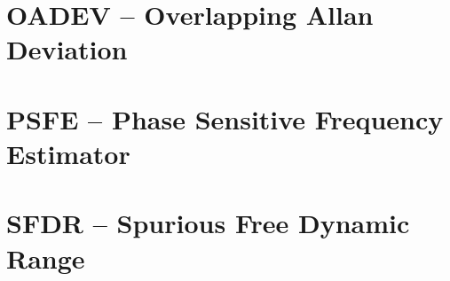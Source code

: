 \documentclass[12pt,a4paper,oneside]{report} %
\begin{document}
\chapter{OADEV -- Overlapping Allan Deviation} %
\stopcontents[maintoc]
\section*{\infosection} %

\section*{\examplesection} %

\resumecontents[maintoc]

\chapter{PSFE -- Phase Sensitive Frequency Estimator} %
\stopcontents[maintoc]
\section*{\infosection} %

\section*{\examplesection} %

\resumecontents[maintoc]

\chapter{SFDR -- Spurious Free Dynamic Range} %
\stopcontents[maintoc]
\section*{\infosection} %

\end{document}
